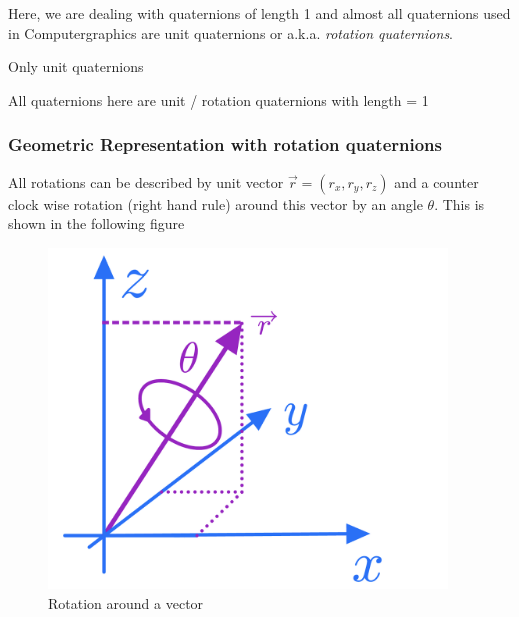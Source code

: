 \documentclass[
  letterpaper,
  DIV=11,
  numbers=noendperiod]{scrartcl}
\begin{document}
Here, we are dealing with quaternions of length 1 and almost all
quaternions used in Computergraphics are unit quaternions or a.k.a.
\emph{rotation quaternions}.

\begin{tcolorbox}[enhanced jigsaw, opacitybacktitle=0.6, rightrule=.15mm, breakable, bottomtitle=1mm, arc=.35mm, colframe=quarto-callout-note-color-frame, coltitle=black, leftrule=.75mm, title=\textcolor{quarto-callout-note-color}{\faInfo}\hspace{0.5em}{Note}, left=2mm, toptitle=1mm, colbacktitle=quarto-callout-note-color!10!white, titlerule=0mm, colback=white, bottomrule=.15mm, toprule=.15mm, opacityback=0]
Only unit quaternions

All quaternions here are unit / rotation quaternions with length = 1
\end{tcolorbox}

\hypertarget{geometric-representation-with-rotation-quaternions}{%
\subsubsection{Geometric Representation with rotation
quaternions}\label{geometric-representation-with-rotation-quaternions}}

All rotations can be described by unit vector \(\vec{r}=(r_x,r_y,r_z)\)
and a counter clock wise rotation (right hand rule) around this vector
by an angle \(\theta\). This is shown in the following figure

\begin{figure}

{\centering \includegraphics[width=4.16667in,height=\textheight]{images/rotation_abitrary_vector.png}

}

\caption{\label{fig-rot}Rotation around a vector}

\end{figure}
\end{document}

